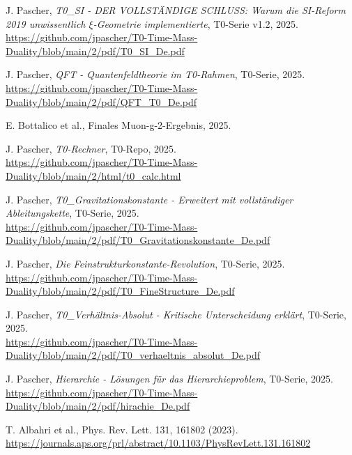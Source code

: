 \documentclass[12pt,a4paper]{article}
\begin{document}
	

\begin{thebibliography}{99}
	 J. Pascher, \textit{T0\_SI - DER VOLLSTÄNDIGE SCHLUSS: Warum die SI-Reform 2019 unwissentlich $\xi$-Geometrie implementierte}, T0-Serie v1.2, 2025. \\
	\url{https://github.com/jpascher/T0-Time-Mass-Duality/blob/main/2/pdf/T0_SI_De.pdf}
	
	 J. Pascher, \textit{QFT - Quantenfeldtheorie im T0-Rahmen}, T0-Serie, 2025. \\
	\url{https://github.com/jpascher/T0-Time-Mass-Duality/blob/main/2/pdf/QFT_T0_De.pdf}
	
	 E. Bottalico et al., Finales Muon-g-2-Ergebnis, 2025.
	
	 J. Pascher, \textit{T0-Rechner}, T0-Repo, 2025. \\
	\url{https://github.com/jpascher/T0-Time-Mass-Duality/blob/main/2/html/t0_calc.html}
	
	 J. Pascher, \textit{T0\_Gravitationskonstante - Erweitert mit vollständiger Ableitungskette}, T0-Serie, 2025. \\
	\url{https://github.com/jpascher/T0-Time-Mass-Duality/blob/main/2/pdf/T0_Gravitationskonstante_De.pdf}
	
	 J. Pascher, \textit{Die Feinstrukturkonstante-Revolution}, T0-Serie, 2025. \\
	\url{https://github.com/jpascher/T0-Time-Mass-Duality/blob/main/2/pdf/T0_FineStructure_De.pdf}
	
	 J. Pascher, \textit{T0\_Verhältnis-Absolut - Kritische Unterscheidung erklärt}, T0-Serie, 2025. \\
	\url{https://github.com/jpascher/T0-Time-Mass-Duality/blob/main/2/pdf/T0_verhaeltnis_absolut_De.pdf}
	
	 J. Pascher, \textit{Hierarchie - Lösungen für das Hierarchieproblem}, T0-Serie, 2025. \\
	\url{https://github.com/jpascher/T0-Time-Mass-Duality/blob/main/2/pdf/hirachie_De.pdf}
	
	 T. Albahri et al., Phys. Rev. Lett. 131, 161802 (2023). \\
	\url{https://journals.aps.org/prl/abstract/10.1103/PhysRevLett.131.161802}
	

\end{thebibliography}
\end{document}
